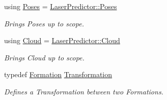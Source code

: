 \begin{DoxyCompactItemize}
\item 
using \hyperlink{classFormation_ae679dc0b3c837ce510678f0fd98baf36}{Poses} = \hyperlink{classLaserPredictor_a6c7dc6bd4bfb6acd3d95e88e1b9b4be2}{Laser\+Predictor\+::\+Poses}\hypertarget{classFormation_ae679dc0b3c837ce510678f0fd98baf36}{}\label{classFormation_ae679dc0b3c837ce510678f0fd98baf36}

\begin{DoxyCompactList}\small\item\em Brings Poses up to scope. \end{DoxyCompactList}\item 
using \hyperlink{classFormation_a35557939fd09f70d86432bfb68f315e2}{Cloud} = \hyperlink{classLaserPredictor_ae6d64da5bf82f544a2ea8a421af5a677}{Laser\+Predictor\+::\+Cloud}\hypertarget{classFormation_a35557939fd09f70d86432bfb68f315e2}{}\label{classFormation_a35557939fd09f70d86432bfb68f315e2}

\begin{DoxyCompactList}\small\item\em Brings Cloud up to scope. \end{DoxyCompactList}\item 
typedef \hyperlink{classFormation}{Formation} \hyperlink{classFormation_ac849f4299770d0303d16a25b55f17a04}{Transformation}\hypertarget{classFormation_ac849f4299770d0303d16a25b55f17a04}{}\label{classFormation_ac849f4299770d0303d16a25b55f17a04}

\begin{DoxyCompactList}\small\item\em Defines a Transformation between two Formations. \end{DoxyCompactList}\end{DoxyCompactItemize}
